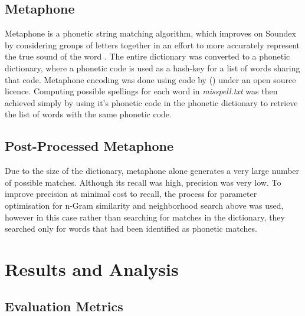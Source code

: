 \documentclass[twocolumn]{article}
\begin{document}
        \subsection{Metaphone}
    Metaphone is a phonetic string matching algorithm, which improves on Soundex by considering groups of letters
    together in an effort to more accurately represent the true sound of the word\autocite{METAPHONE} .
    The entire dictionary was converted to a phonetic dictionary, where a phonetic code is used as a hash-key for a
    list of words sharing that code.
    Metaphone encoding was done using code by (\cite{PHONO}) under an open source licence.
    Computing possible spellings for each word in \textit{misspell.txt} was then achieved simply by using it's phonetic
    code in the phonetic dictionary to retrieve the list of words with the same phonetic code.

        \subsection{Post-Processed Metaphone}
    Due to the size of the dictionary, metaphone alone generates a very large number of possible matches.
    Although its recall was high, precision was very low.
    To improve precision at minimal cost to recall, the process for parameter optimisation for n-Gram
    similarity and neighborhood search above was used, however in this case rather than searching for matches in the
    dictionary, they searched only for words that had been identified as phonetic matches.




    \section{Results and Analysis}

        \subsection{Evaluation Metrics}
\end{document}

